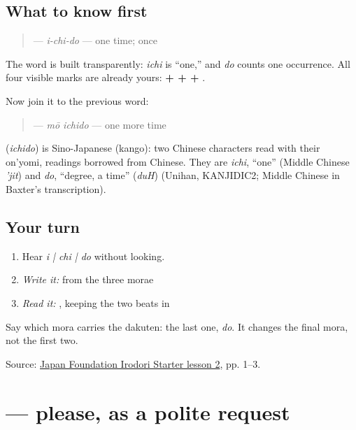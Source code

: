 \subsection*{What to know first}
\begin{quote}
\textbf{} — \emph{i-chi-do} — one time; once
\end{quote}

The word is built transparently: \emph{ichi} is “one,” and \emph{do} counts one occurrence. All four visible marks are already yours: \textbf{ +  +  + }.

Now join it to the previous word:

\begin{quote}
\textbf{} — \emph{mō ichido} — one more time
\end{quote}

\begin{cousinweb}
\textbf{} (\emph{ichido}) is Sino-Japanese (kango): two Chinese characters read with their on'yomi, readings borrowed from Chinese. They are \emph{ichi}, \textquotedblleft{}one\textquotedblright{} (Middle Chinese \emph{'jit}) and \emph{do}, \textquotedblleft{}degree, a time\textquotedblright{} (\emph{duH}) (Unihan, KANJIDIC2; Middle Chinese in Baxter's transcription).
\end{cousinweb}

\subsection*{Your turn}
\begin{enumerate}
\raggedright
  \item Hear \emph{i | chi | do} without looking.
  \item \emph{Write it:} \textbf{} from the three morae
  \item \emph{Read it:} \textbf{}, keeping the two beats in \textbf{}
\end{enumerate}

\begin{tcolorbox}[breakable,colback=teal!4,colframe=teal!35!black,title={Before you move on}]
Say which mora carries the dakuten: the last one, \emph{do}. It changes the final mora, not the first two.

Source: \href{https://www.irodori.jpf.go.jp/assets/data/starter/pdf/X\_L02.pdf}{Japan Foundation Irodori Starter lesson 2}, pp. 1–3.
\end{tcolorbox}
\section[\texorpdfstring{\ja{おねがいします} (onegai shimasu)}{おねがいします (onegai shimasu)}]{ — please, as a polite request}

